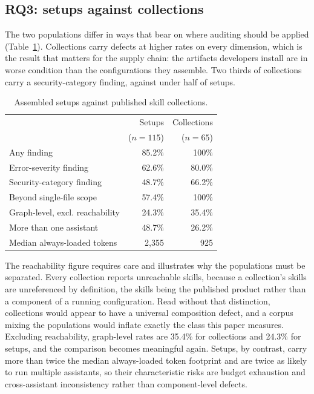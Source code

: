 \documentclass[conference]{IEEEtran}
\begin{document}
\subsection{RQ3: setups against collections}
\label{sec:rq3}

The two populations differ in ways that bear on where auditing should be applied
(Table~\ref{tab:compare}). Collections carry defects at higher rates on every
dimension, which is the result that matters for the supply chain: the artifacts
developers install are in worse condition than the configurations they assemble.
Two thirds of collections carry a security-category finding, against under half
of setups.

\begin{table}[t]
\caption{Assembled setups against published skill collections.}
\label{tab:compare}
\centering
\small
\begin{tabular}{lrr}
\toprule
 & Setups & Collections \\
 & ($n=115$) & ($n=65$) \\
\midrule
Any finding                     & 85.2\% & 100\% \\
Error-severity finding          & 62.6\% & 80.0\% \\
Security-category finding       & 48.7\% & 66.2\% \\
Beyond single-file scope        & 57.4\% & 100\% \\
Graph-level, excl. reachability & 24.3\% & 35.4\% \\
More than one assistant         & 48.7\% & 26.2\% \\
Median always-loaded tokens     & 2{,}355 & 925 \\
\bottomrule
\end{tabular}
\end{table}

The reachability figure requires care and illustrates why the populations must
be separated. Every collection reports unreachable skills, because a
collection's skills are unreferenced by definition, the skills being the
published product rather than a component of a running configuration. Read
without that distinction, collections would appear to have a universal
composition defect, and a corpus mixing the populations would inflate exactly
the class this paper measures. Excluding reachability, graph-level rates are
35.4\% for collections and 24.3\% for setups, and the comparison becomes
meaningful again. Setups, by contrast, carry more than twice the median
always-loaded token footprint and are twice as likely to run multiple
assistants, so their characteristic risks are budget exhaustion and
cross-assistant inconsistency rather than component-level defects.
\end{document}
